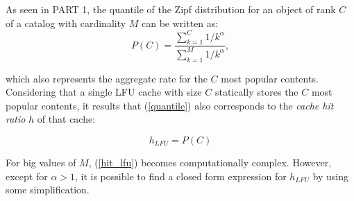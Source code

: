 \documentclass[10pt]{article}
\newcommand{\fakeacmpar}[1]{\vspace{2 mm}\noindent{\textbf{#1.}}}
\begin{document}
\fakeacmpar{LFU}
As seen in PART 1, the quantile of the Zipf distribution for an object of rank $C$ of a catalog with cardinality $M$ can be written as:
\begin{equation}\label{quantile}
P(C)=\frac{\sum_{k=1}^C{1/k^\alpha}}{\sum_{k=1}^M{1/k^\alpha}},  
\end{equation}

which also represents the aggregate rate for the $C$ most popular contents.
Considering that a single LFU cache with size $C$ statically stores the $C$ most popular contents, it results that (\ref{quantile}) also corresponds to the \emph{cache hit ratio} $h$ of that cache:

\begin{equation}\label{hit_lfu}
h_{LFU} = P(C)
\end{equation}

For big values of $M$, (\ref{hit_lfu}) becomes computationally complex. However, except for $\alpha > 1$, it is possible to find a closed form expression for $h_{LFU}$ by using some simplification. 
\end{document}
